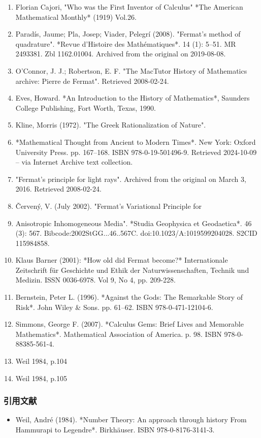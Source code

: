 \begin{enumerate}
\item Florian Cajori, "Who was the First Inventor of Calculus" *The American Mathematical Monthly* (1919) Vol.26.  
\item Paradís, Jaume; Pla, Josep; Viader, Pelegrí (2008). "Fermat's method of quadrature". *Revue d'Histoire des Mathématiques*. 14 (1): 5–51. MR 2493381. Zbl 1162.01004. Archived from the original on 2019-08-08.  
\item O'Connor, J. J.; Robertson, E. F. "The MacTutor History of Mathematics archive: Pierre de Fermat". Retrieved 2008-02-24.  
\item Eves, Howard. *An Introduction to the History of Mathematics*, Saunders College Publishing, Fort Worth, Texas, 1990.  
\item Kline, Morris (1972). "The Greek Rationalization of Nature". \item *Mathematical Thought from Ancient to Modern Times*. New York: Oxford University Press. pp. 167–168. ISBN 978-0-19-501496-9. Retrieved 2024-10-09 – via Internet Archive text collection.  
\item "Fermat's principle for light rays". Archived from the original on March 3, 2016. Retrieved 2008-02-24.  
\item Červený, V. (July 2002). "Fermat's Variational Principle for \item Anisotropic Inhomogeneous Media". *Studia Geophysica et Geodaetica*. 46 (3): 567. Bibcode:2002StGG...46..567C. doi:10.1023/A:1019599204028. S2CID 115984858.  
\item Klaus Barner (2001): *How old did Fermat become?* Internationale Zeitschrift für Geschichte und Ethik der Naturwissenschaften, Technik und Medizin. ISSN 0036-6978. Vol 9, No 4, pp. 209-228.  
\item Bernstein, Peter L. (1996). *Against the Gods: The Remarkable Story of Risk*. John Wiley & Sons. pp. 61–62. ISBN 978-0-471-12104-6.  
\item Simmons, George F. (2007). *Calculus Gems: Brief Lives and Memorable Mathematics*. Mathematical Association of America. p. 98. ISBN 978-0-88385-561-4.  
\item Weil 1984, p.104  
\item Weil 1984, p.105
\end{enumerate}
\subsubsection{引用文献}  
\begin{itemize}
\item Weil, André (1984). *Number Theory: An approach through history From Hammurapi to Legendre*. Birkhäuser. ISBN 978-0-8176-3141-3.
\end{itemize}
